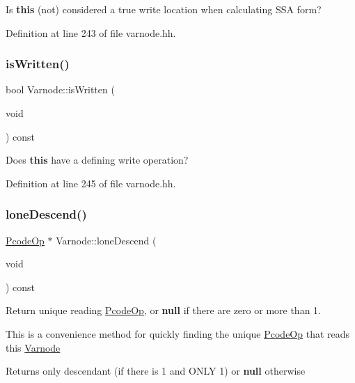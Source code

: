 Is {\bfseries{this}} (not) considered a true write location when calculating S\+SA form? 



Definition at line 243 of file varnode.\+hh.

\mbox{\label{class_varnode_a6bb7eafb49a6ddea2bac8f4ab5aed6e9}} 
\subsubsection{\texorpdfstring{isWritten()}{isWritten()}}
{\footnotesize\ttfamily bool Varnode\+::is\+Written (\begin{DoxyParamCaption}\item[{void}]{ }\end{DoxyParamCaption}) const\hspace{0.3cm}{\ttfamily [inline]}}



Does {\bfseries{this}} have a defining write operation? 



Definition at line 245 of file varnode.\+hh.

\mbox{\label{class_varnode_a1899f1f493fed54c6dea1f445f146de6}} 
\subsubsection{\texorpdfstring{loneDescend()}{loneDescend()}}
{\footnotesize\ttfamily \mbox{\hyperlink{class_pcode_op}{Pcode\+Op}} $\ast$ Varnode\+::lone\+Descend (\begin{DoxyParamCaption}\item[{void}]{ }\end{DoxyParamCaption}) const}



Return unique reading \mbox{\hyperlink{class_pcode_op}{Pcode\+Op}}, or {\bfseries{null}} if there are zero or more than 1. 

This is a convenience method for quickly finding the unique \mbox{\hyperlink{class_pcode_op}{Pcode\+Op}} that reads this \mbox{\hyperlink{class_varnode}{Varnode}} \begin{DoxyReturn}{Returns}
only descendant (if there is 1 and O\+N\+LY 1) or {\bfseries{null}} otherwise 
\end{DoxyReturn}


